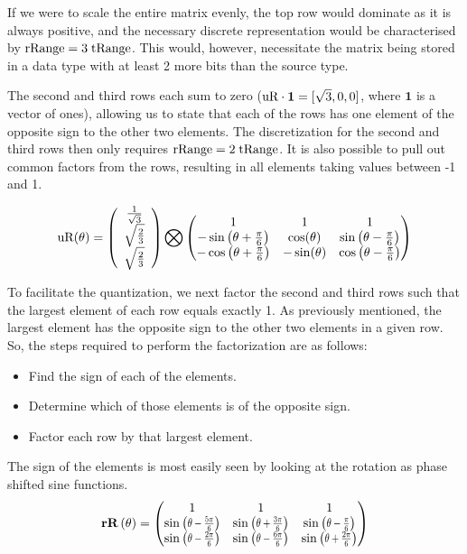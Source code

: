 If we were to scale the entire matrix evenly, the top row would dominate as it is always positive, and the necessary discrete representation would be characterised by $\text{rRange} = 3 \; \text{tRange}$. This would, however, necessitate the matrix being stored in a data type with at least 2 more bits than the source type.

The second and third rows each sum to zero ($\text{uR} \cdot \mathbf{1} = [\sqrt{3},0,0]$, where $\mathbf{1}$ is a vector of ones), allowing us to state that each of the rows has one element of the opposite sign to the other two elements. The discretization for the second and third rows then only requires $\text{rRange} = 2 \; \text{tRange}$. It is also possible to pull out common factors from the rows, resulting in all elements taking values between -1 and 1.

\begin{equation}
\text{uR}(\theta) =
\left(
\begin{array}{c}
 \frac{1}{\sqrt{3}} \\
 \sqrt{\frac{2}{3}}  \\
 \sqrt{\frac{2}{3}} \\
\end{array}
\right) \bigotimes
\begin{pmatrix}
 1 & 1 & 1 \\
 -\sin \left(\theta +\frac{\pi}{6}\right) &  \cos (\theta ) &  \sin \left(\theta -\frac{\pi}{6}\right) \\
 -\cos \left(\theta +\frac{\pi}{6}\right) & - \sin (\theta ) & \cos \left(\theta -\frac{\pi}{6}\right) \\
\end{pmatrix}
\end{equation}

To facilitate the quantization, we next factor the second and third rows such that the largest element of each row equals exactly 1. As previously mentioned, the largest element has the opposite sign to the other two elements in a given row. So, the steps required to perform the factorization are as follows:

\begin{itemize}
\item{Find the sign of each of the elements.}
\item{Determine which of those elements is of the opposite sign.}
\item{Factor each row by that largest element.}
\end{itemize}

The sign of the elements is most easily seen by looking at the rotation as phase shifted sine functions.
\begin{equation}
\rR[\theta]=
\begin{pmatrix}
 1 & 1 & 1 \\
 \sine{\theta -\frac{5 \pi }{6}}  & \sine{\theta +\frac{3 \pi }{6}}  & \sine{\theta -\Pii{6}}  \\
 \sine{\theta -\frac{2 \pi }{6}}  & \sine{\theta -\frac{6 \pi }{6}}  & \sine{\theta +\frac{2 \pi }{6}}  \\
\end{pmatrix}
\end{equation}

